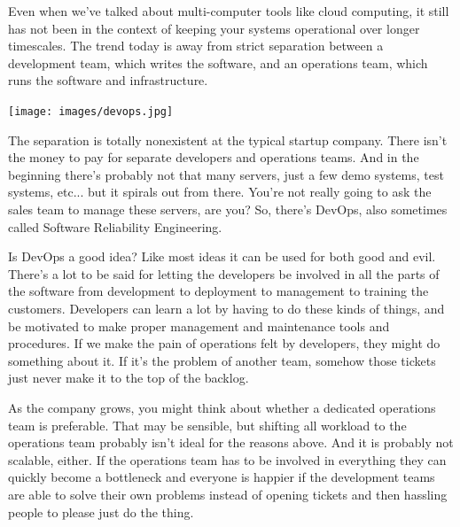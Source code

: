 \documentclass[a4paper]{report}
\begin{document}
Even when we've talked about multi-computer tools like cloud
computing, it still has not been in the context of keeping your
systems operational over longer timescales. The trend today is away
from strict separation between a development team, which writes the
software, and an operations team, which runs the software and infrastructure.

\begin{center}
	\texttt{[image: images/devops.jpg]}
\end{center}

The separation is totally nonexistent at the typical startup company. There isn't the money to pay for separate developers and operations teams. And in the beginning there's probably not that many servers, just a few demo systems, test systems, etc... but it spirals out from there. You're not really going to ask the sales team to manage these servers, are you? So, there's DevOps, also sometimes called Software Reliability Engineering.

Is DevOps a good idea? Like most ideas it can be used for both good and evil. There's a lot to be said for letting the developers be involved in all the parts of the software from development to deployment to management to training the customers. Developers can learn a lot by having to do these kinds of things, and be motivated to make proper management and maintenance tools and procedures. If we make the pain of operations felt by developers, they might do something about it. If it's the problem of another team, somehow those tickets just never make it to the top of the backlog.

As the company grows, you might think about whether a dedicated operations team is preferable. That may be sensible, but shifting all workload to the operations team probably isn't ideal for the reasons above. And it is probably not scalable, either. If the operations team has to be involved in everything they can quickly become a bottleneck and everyone is happier if the development teams are able to solve their own problems instead of opening tickets and then hassling people to please just do the thing.
\end{document}

